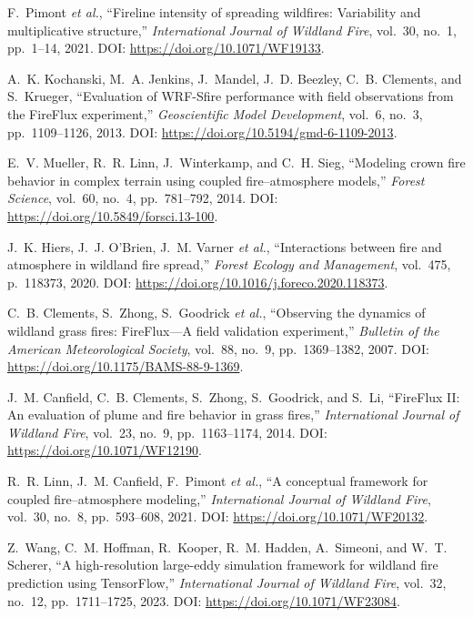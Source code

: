 \documentclass[conference]{IEEEtran}
\begin{document}
\begin{thebibliography}{00}
F.~Pimont \emph{et al.},
``Fireline intensity of spreading wildfires: Variability and multiplicative structure,''
\emph{International Journal of Wildland Fire}, vol.~30, no.~1, pp.~1--14, 2021. DOI: \url{https://doi.org/10.1071/WF19133}.

A.~K. Kochanski, M.~A. Jenkins, J.~Mandel, J.~D. Beezley, C.~B. Clements, and S.~Krueger,
``Evaluation of WRF-Sfire performance with field observations from the FireFlux experiment,''
\emph{Geoscientific Model Development}, vol.~6, no.~3, pp.~1109--1126, 2013. DOI: \url{https://doi.org/10.5194/gmd-6-1109-2013}.

E.~V. Mueller, R.~R. Linn, J.~Winterkamp, and C.~H. Sieg,
``Modeling crown fire behavior in complex terrain using coupled fire--atmosphere models,''
\emph{Forest Science}, vol.~60, no.~4, pp.~781--792, 2014. DOI: \url{https://doi.org/10.5849/forsci.13-100}.

J.~K. Hiers, J.~J. O’Brien, J.~M. Varner \emph{et al.},
``Interactions between fire and atmosphere in wildland fire spread,''
\emph{Forest Ecology and Management}, vol.~475, p.~118373, 2020. DOI: \url{https://doi.org/10.1016/j.foreco.2020.118373}.

C.~B. Clements, S.~Zhong, S.~Goodrick \emph{et al.},
``Observing the dynamics of wildland grass fires: FireFlux---A field validation experiment,''
\emph{Bulletin of the American Meteorological Society}, vol.~88, no.~9, pp.~1369--1382, 2007. DOI: \url{https://doi.org/10.1175/BAMS-88-9-1369}.

J.~M. Canfield, C.~B. Clements, S.~Zhong, S.~Goodrick, and S.~Li,
``FireFlux II: An evaluation of plume and fire behavior in grass fires,''
\emph{International Journal of Wildland Fire}, vol.~23, no.~9, pp.~1163--1174, 2014. DOI: \url{https://doi.org/10.1071/WF12190}.

R.~R. Linn, J.~M. Canfield, F.~Pimont \emph{et al.},
``A conceptual framework for coupled fire--atmosphere modeling,''
\emph{International Journal of Wildland Fire}, vol.~30, no.~8, pp.~593--608, 2021. DOI: \url{https://doi.org/10.1071/WF20132}.

Z.~Wang, C.~M. Hoffman, R.~Kooper, R.~M. Hadden, A.~Simeoni, and W.~T. Scherer,
``A high-resolution large-eddy simulation framework for wildland fire prediction using TensorFlow,''
\emph{International Journal of Wildland Fire}, vol.~32, no.~12, pp.~1711--1725, 2023. DOI: \url{https://doi.org/10.1071/WF23084}.


\end{thebibliography}
\end{document}
